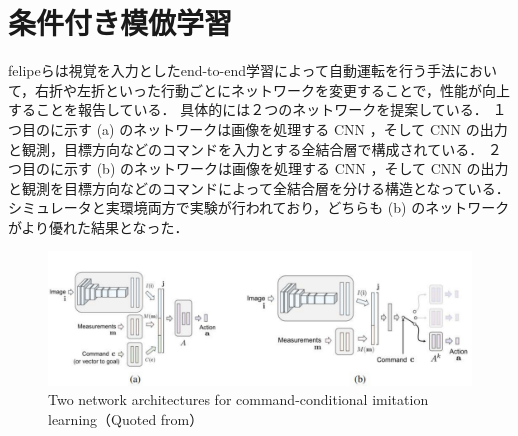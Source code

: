 \section{条件付き模倣学習}
felipeらは視覚を入力としたend-to-end学習によって自動運転を行う手法において，右折や左折といった行動ごとにネットワークを変更することで，性能が向上することを報告している．
具体的には２つのネットワークを提案している．
１つ目のに示す (a) のネットワークは画像を処理する CNN ，そして CNN の出力と観測，目標方向などのコマンドを入力とする全結合層で構成されている．
２つ目のに示す (b) のネットワークは画像を処理する CNN ，そして CNN の出力と観測を目標方向などのコマンドによって全結合層を分ける構造となっている．
シミュレータと実環境両方で実験が行われており，どちらも (b) のネットワークがより優れた結果となった．

\begin{figure}[htbp]
  \centering
  \includegraphics[width=140mm]{images/pdf/other/branched.pdf}
  \caption{Two network architectures for command-conditional imitation learning（Quoted from\cite{codevilla2018endtoend}）}
  \label{fig:felipe_branched}
\end{figure}

\clearpage